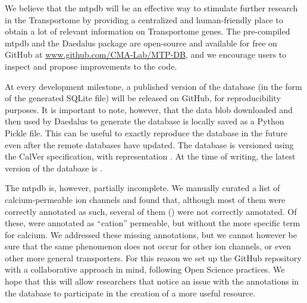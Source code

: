 We believe that the \gls{mtpdb} will be an effective way to stimulate further
research in the Transportome by providing a centralized and human-friendly place
to obtain a lot of relevant information on Transportome genes. The pre-compiled
\gls{mtpdb} and the Daedalus package are open-source and available for free on
GitHub at
\href{https://github.com/CMA-Lab/MTP-DB/}{www.github.com/CMA-Lab/MTP-DB}, and we
encourage users to inspect and propose improvements to the code.

At every development milestone, a published version of the database (in the form
of the generated SQLite file) will be released on GitHub, for reproducibility
purposes. It is important to note, however, that the data blob downloaded and
then used by Daedalus to generate the database is locally saved as a Python
Pickle file. This can be useful to exactly reproduce the database in the future
even after the remote databases have updated. The database is versioned using
the CalVer specification, with representation . At
the time of writing, the latest version of the database is .

The \gls{mtpdb} is, however, partially incomplete. We manually curated a list of
 calcium-permeable ion channels and found that, although
most of them were correctly annotated as such, several of them () were not correctly annotated. Of these,  were annotated
as ``cation'' permeable, but without the more specific term for calcium. We
addressed these missing annotations, but we cannot however be sure that the same
phenomenon does not occur for other ion channels, or even other more general
transporters. For this reason we set up the GitHub repository with a collaborative approach
in mind, following Open Science practices. We hope that this will allow
researchers that notice an issue with the annotations in the database to
participate in the creation of a more useful resource.



